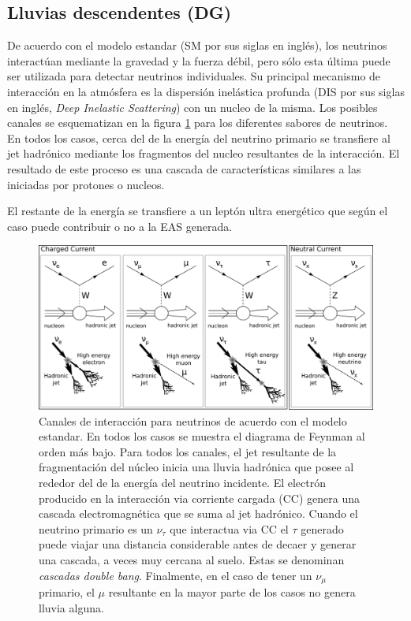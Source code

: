 \subsection{Lluvias descendentes (DG)}

De acuerdo con el modelo estandar (SM por sus siglas en inglés), los neutrinos interactúan mediante la gravedad y la fuerza débil, pero sólo esta última puede ser utilizada para detectar neutrinos individuales.
Su principal mecanismo de interacción en la atmósfera es la dispersión inelástica profunda (DIS por sus siglas en inglés, \emph{Deep Inelastic Scattering}) con un nucleo de la misma. Los posibles canales se esquematizan en la figura \ref{fig:SM_nu_int} para los diferentes sabores de neutrinos.
En todos los casos, cerca del  de la energía del neutrino primario se transfiere al jet hadrónico mediante los fragmentos del nucleo resultantes de la interacción.
El resultado de este proceso es una cascada de características similares a las iniciadas por protones o nucleos.

El  restante de la energía se transfiere a un leptón ultra energético que según el caso puede contribuir o no a la EAS generada.
%
\begin{figure}[ht]
\begin{center}
\includegraphics[width=1.0\textwidth]{fig/EASAuger/nu_channels_english.pdf}
\caption{Canales de interacción para neutrinos de acuerdo con el modelo estandar.
En todos los casos se muestra el diagrama de Feynman al orden más bajo.
Para todos los canales, el jet resultante de la fragmentación del núcleo inicia una lluvia hadrónica que posee al rededor del  de la energía del neutrino incidente.
El electrón producido en la interacción via corriente cargada (CC) genera una cascada electromagnética que se suma al jet hadrónico.
Cuando el neutrino primario es un $\nu_{\tau}$ que interactua via CC el $\tau$ generado puede viajar una distancia considerable antes de decaer y generar una cascada, a veces muy cercana al suelo.
Estas se denominan \emph{cascadas double bang}.
Finalmente, en el caso de tener un $\nu_{\mu}$ primario, el $\mu$ resultante en la mayor parte de los casos no genera lluvia alguna.
}
\label{fig:SM_nu_int}
\end{center}
\end{figure}


